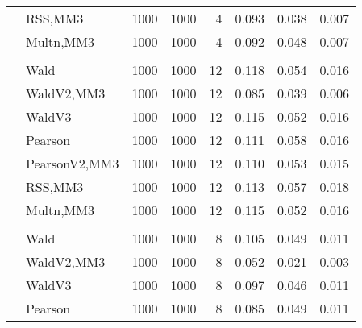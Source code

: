\documentclass[
]{article}
\begin{document}
\begin{table}[H]
{\begin{tabular}[t]{llrrrrrr}
\hspace{1em} & RSS,MM3 & 1000 & 1000 & 4 & 0.093 & 0.038 & 0.007\\

\hspace{1em} & Multn,MM3 & 1000 & 1000 & 4 & 0.092 & 0.048 & 0.007\\
\cmidrule{1-8}
\addlinespace[0.3em]
\multicolumn{8}{l}{\textbf{1F 15V}}\\
\hspace{1em} & Wald & 1000 & 1000 & 12 & 0.118 & 0.054 & 0.016\\

\hspace{1em} & WaldV2,MM3 & 1000 & 1000 & 12 & 0.085 & 0.039 & 0.006\\

\hspace{1em} & WaldV3 & 1000 & 1000 & 12 & 0.115 & 0.052 & 0.016\\

\hspace{1em} & Pearson & 1000 & 1000 & 12 & 0.111 & 0.058 & 0.016\\

\hspace{1em} & PearsonV2,MM3 & 1000 & 1000 & 12 & 0.110 & 0.053 & 0.015\\

\hspace{1em} & RSS,MM3 & 1000 & 1000 & 12 & 0.113 & 0.057 & 0.018\\

\hspace{1em} & Multn,MM3 & 1000 & 1000 & 12 & 0.115 & 0.052 & 0.016\\
\cmidrule{1-8}
\addlinespace[0.3em]
\multicolumn{8}{l}{\textbf{2F 10V}}\\
\hspace{1em} & Wald & 1000 & 1000 & 8 & 0.105 & 0.049 & 0.011\\

\hspace{1em} & WaldV2,MM3 & 1000 & 1000 & 8 & 0.052 & 0.021 & 0.003\\

\hspace{1em} & WaldV3 & 1000 & 1000 & 8 & 0.097 & 0.046 & 0.011\\

\hspace{1em} & Pearson & 1000 & 1000 & 8 & 0.085 & 0.049 & 0.011\\


\end{tabular}}
\end{table}
\end{document}
